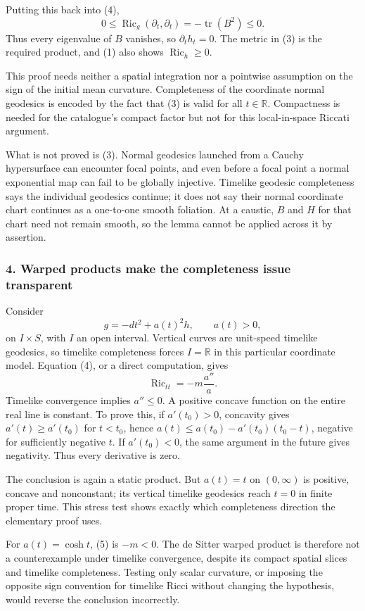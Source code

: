 \documentclass[11pt]{article}
\begin{document}
Putting this back into (4),
\[
 0\le\operatorname{Ric}_g(\partial_t,\partial_t)
   =-\operatorname{tr}(B^2)\le0.
\]
Thus every eigenvalue of $B$ vanishes, so $\partial_t h_t=0$. The metric in (3) is the required product, and (1) also shows $\operatorname{Ric}_h\ge0$.

This proof needs neither a spatial integration nor a pointwise assumption on the sign of the initial mean curvature. Completeness of the coordinate normal geodesics is encoded by the fact that (3) is valid for all $t\in\mathbb R$. Compactness is needed for the catalogue's compact factor but not for this local-in-space Riccati argument.

What is not proved is (3). Normal geodesics launched from a Cauchy hypersurface can encounter focal points, and even before a focal point a normal exponential map can fail to be globally injective. Timelike geodesic completeness says the individual geodesics continue; it does not say their normal coordinate chart continues as a one-to-one smooth foliation. At a caustic, $B$ and $H$ for that chart need not remain smooth, so the lemma cannot be applied across it by assertion.

\subsubsection{4. Warped products make the completeness issue transparent}
Consider
\[
 g=-dt^2+a(t)^2h,\qquad a(t)>0,
\]
on $I\times S$, with $I$ an open interval. Vertical curves are unit-speed timelike geodesics, so timelike completeness forces $I=\mathbb R$ in this particular coordinate model. Equation (4), or a direct computation, gives
\[
 \operatorname{Ric}_{tt}=-m\frac{a''}{a}.               \tag{5}
\]
Timelike convergence implies $a''\le0$. A positive concave function on the entire real line is constant. To prove this, if $a'(t_0)>0$, concavity gives $a'(t)\ge a'(t_0)$ for $t<t_0$, hence
$a(t)\le a(t_0)-a'(t_0)(t_0-t)$, negative for sufficiently negative $t$. If $a'(t_0)<0$, the same argument in the future gives negativity. Thus every derivative is zero.

The conclusion is again a static product. But $a(t)=t$ on $(0,\infty)$ is positive, concave and nonconstant; its vertical timelike geodesics reach $t=0$ in finite proper time. This stress test shows exactly which completeness direction the elementary proof uses.

For $a(t)=\cosh t$, (5) is $-m<0$. The de Sitter warped product is therefore not a counterexample under timelike convergence, despite its compact spatial slices and timelike completeness. Testing only scalar curvature, or imposing the opposite sign convention for timelike Ricci without changing the hypothesis, would reverse the conclusion incorrectly.
\end{document}
